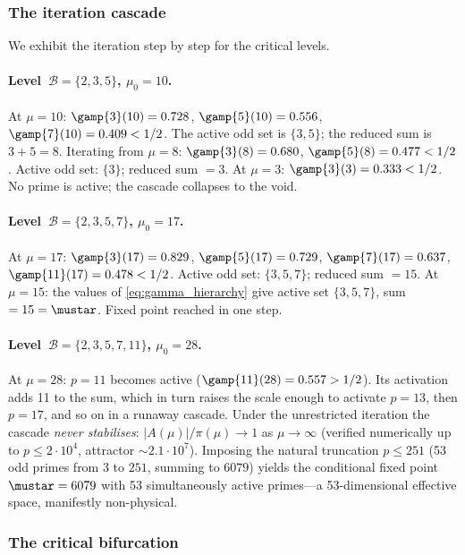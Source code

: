 \documentclass[12pt,a4paper]{article}
\begin{document}
\subsubsection{The iteration cascade}

We exhibit the iteration step by step for the critical levels.

\paragraph{Level~$\mathcal{B} = \{2,3,5\}$, $\mu_0 = 10$.}
At $\mu = 10$:
$\gamp{3}(10) = 0.728$, $\gamp{5}(10) = 0.556$,
$\gamp{7}(10) = 0.409 < 1/2$.
The active odd set is $\{3,5\}$; the reduced sum is $3 + 5 = 8$.
Iterating from $\mu = 8$:
$\gamp{3}(8) = 0.680$, $\gamp{5}(8) = 0.477 < 1/2$.
Active odd set: $\{3\}$; reduced sum $= 3$.
At $\mu = 3$: $\gamp{3}(3) = 0.333 < 1/2$.
No prime is active; the cascade collapses to the void.

\paragraph{Level~$\mathcal{B} = \{2,3,5,7\}$, $\mu_0 = 17$.}
At $\mu = 17$:
$\gamp{3}(17) = 0.829$, $\gamp{5}(17) = 0.729$,
$\gamp{7}(17) = 0.637$, $\gamp{11}(17) = 0.478 < 1/2$.
Active odd set: $\{3,5,7\}$; reduced sum $= 15$.
At $\mu = 15$: the values of \eqref{eq:gamma_hierarchy} give
active set $\{3,5,7\}$, sum $= 15 = \mustar$.  Fixed point reached
in one step.

\paragraph{Level~$\mathcal{B} = \{2,3,5,7,11\}$, $\mu_0 = 28$.}
At $\mu = 28$: $p = 11$ becomes active ($\gamp{11}(28) = 0.557
> 1/2$).  Its activation adds 11 to the sum, which in turn raises
the scale enough to activate $p = 13$, then $p = 17$, and so on
in a runaway cascade.  Under the unrestricted iteration the cascade
\emph{never stabilises}: $|A(\mu)|/\pi(\mu) \to 1$ as $\mu \to \infty$
(verified numerically up to $p \leq 2 \cdot 10^4$, attractor
$\sim 2.1 \cdot 10^7$).  Imposing the natural truncation $p \leq 251$
(53 odd primes from $3$ to $251$, summing to $6079$) yields the
conditional fixed point $\mustar = 6079$ with 53 simultaneously
active primes---a 53-dimensional effective space, manifestly
non-physical.

\subsubsection{The critical bifurcation}
\label{sec:ch8_critical_bifurcation}
\end{document}
